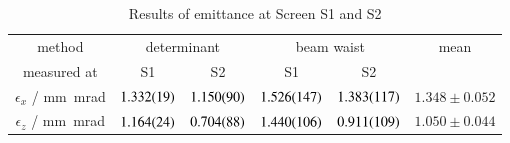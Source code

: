\documentclass[11pt,a4paper,notitlepage]{scrartcl}
\begin{document}
\begin{table}[htbp]
	\centering
	\begin{tabular}{c||cc|cc||c}
		
		method&\multicolumn{2}{c|}{determinant} & \multicolumn{2}{c||}{beam waist}& mean\\
		measured at&S1 & S2& S1 & S2&\\
		\hline
		$\epsilon_{x}$ / \si{\milli\m\milli\radian} &$\SI{1.332\pm0.019}{}$&$\SI{1.150\pm0.090}{}$&$\SI{1.526\pm0.147}{}$&$\SI{1.383\pm0.117}{}$&$1.348\pm0.052$\\
		\hline
		\hline
		$\epsilon_{z}$ / \si{\milli\m\milli\radian} &$\SI{1.164\pm0.024}{}$&$\SI{0.704\pm0.088}{}$&$\SI{1.440\pm0.106}{}$&$\SI{0.911\pm0.109}{}$&$1.050\pm0.044$\\

	\end{tabular}
	
	\caption{Results of emittance at Screen S1 and S2}
	\label{tab:res1}
\end{table}
\end{document}
